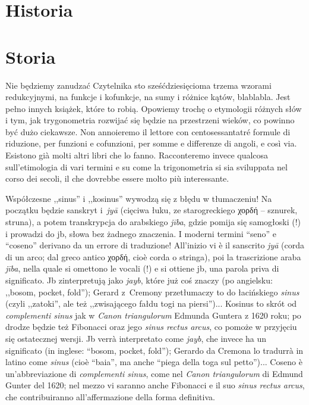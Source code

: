 
%

\section{Historia} %
\section{Storia} %

Nie będziemy zanudzać Czytelnika sto sześćdziesięcioma trzema wzorami redukcyjnymi, na funkcje i kofunkcje, na sumy i różnice kątów, blablabla. %
Jest pełno innych książek, które to robią. %
Opowiemy trochę o etymologii różnych słów i tym, jak trygonometria rozwijać się będzie na przestrzeni wieków, co powinno być dużo ciekawsze. %
Non annoieremo il lettore con centosessantatré formule di riduzione, per funzioni e cofunzioni, per somme e differenze di angoli, e così via. %
Esistono già molti altri libri che lo fanno. %
Racconteremo invece qualcosa sull'etimologia di vari termini e su come la trigonometria si sia sviluppata nel corso dei secoli, il che dovrebbe essere molto più interessante. %

Współczesne ,,sinus'' i ,,kosinus'' wywodzą się z błędu w tłumaczeniu! %
Na początku będzie sanskryt i~\emph{jyā} (cięciwa łuku, ze starogreckiego χορδή -- sznurek, struna), a potem transkrypcja do arabskiego \emph{jība}, gdzie pomija się samogłoski (!) i prowadzi do jb, słowa bez żadnego znaczenia. %
I moderni termini ``seno'' e ``coseno'' derivano da un errore di traduzione! %
All'inizio vi è il sanscrito \emph{jyā} (corda di un arco; dal greco antico χορδή, cioè corda o stringa), poi la trascrizione araba \emph{jība}, nella quale si omettono le vocali (!) e si ottiene jb, una parola priva di significato. %
Jb zinterpretują jako \emph{jayb}, które już coś znaczy (po angielsku: ,,bosom, pocket, fold''); Gerard z~Cremony przetłumaczy to do łacińskiego \emph{sinus} (czyli ,,zatoki'', ale też ,,zwisającego fałdu togi na piersi'')... %
Kosinus to skrót od \emph{complementi sinus} jak w \emph{Canon triangulorum} Edmunda Guntera z 1620 roku; po drodze będzie też Fibonacci oraz jego \emph{sinus rectus arcus}, co pomoże w przyjęciu się ostatecznej wersji. %
Jb verrà interpretato come \emph{jayb}, che invece ha un significato (in inglese: ``bosom, pocket, fold''); Gerardo da Cremona lo tradurrà in latino come \emph{sinus} (cioè ``baia'', ma anche ``piega della toga sul petto'')... %
Coseno è un'abbreviazione di \emph{complementi sinus}, come nel \emph{Canon triangulorum} di Edmund Gunter del 1620; nel mezzo vi saranno anche Fibonacci e il suo \emph{sinus rectus arcus}, che contribuiranno all'affermazione della forma definitiva. %

